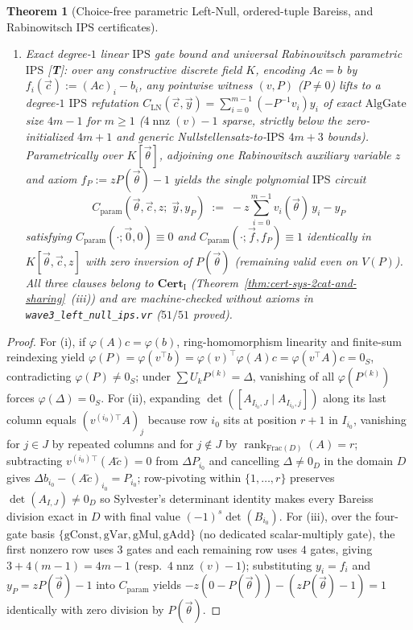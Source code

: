 \documentclass[11pt]{article}
\theoremstyle{plain}
\newtheorem{theorem}{Theorem}[section]
\theoremstyle{definition}
\begin{document}
\begin{theorem}[Choice-free parametric Left-Null, ordered-tuple Bareiss, and Rabinowitsch $\mathrm{IPS}$ certificates]
\begin{enumerate}[nosep,label=(\roman*)]
\item \emph{Exact degree-$1$ linear $\mathrm{IPS}$ gate bound and universal Rabinowitsch parametric $\mathrm{IPS}$ \textup{[\textbf{T}]}}: over any constructive discrete field $K$, encoding $Ac = b$ by $f_i(\vec{c}) := (Ac)_i - b_i$, any pointwise witness $(v, P)$ ($P \neq 0$) lifts to a degree-$1$ $\mathrm{IPS}$ refutation $C_{\mathrm{LN}}(\vec{c}, \vec{y}) = \sum_{i=0}^{m-1} (-P^{-1} v_i) y_i$ of exact $\mathrm{AlgGate}$ size $4m - 1$ for $m \ge 1$ ($4\operatorname{nnz}(v) - 1$ sparse, strictly below the zero-initialized $4m + 1$ and generic Nullstellensatz-to-$\mathrm{IPS}$ $4m + 3$ bounds). Parametrically over $K[\vec{\theta}]$, adjoining one Rabinowitsch auxiliary variable $z$ and axiom $f_P := z P(\vec{\theta}) - 1$ yields the single polynomial $\mathrm{IPS}$ circuit
\[
  C_{\mathrm{param}}(\vec{\theta}, \vec{c}, z;\; \vec{y}, y_P) \;:=\; -z \sum_{i=0}^{m-1} v_i(\vec{\theta})\, y_i - y_P
\]
satisfying $C_{\mathrm{param}}(\cdot; \vec{0}, 0) \equiv 0$ and $C_{\mathrm{param}}(\cdot; \vec{f}, f_P) \equiv 1$ identically in $K[\vec{\theta}, \vec{c}, z]$ with \emph{zero inversion of $P(\vec{\theta})$} (remaining valid even on $V(P)$). All three clauses belong to $\mathbf{Cert}_{\mathrm{I}}$ (Theorem~\ref{thm:cert-sys-2cat-and-sharing}~(iii)) and are machine-checked without axioms in \texttt{wave3\_left\_null\_ips.vr} ($51/51$ proved).
\end{enumerate}
\end{theorem}
\begin{proof}
For (i), if $\varphi(A)c = \varphi(b)$, ring-homomorphism linearity and finite-sum reindexing yield $\varphi(P) = \varphi(v^\top b) = \varphi(v)^\top \varphi(A) c = \varphi(v^\top A) c = 0_S$, contradicting $\varphi(P) \neq 0_S$; under $\sum U_k P^{(k)} = \Delta$, vanishing of all $\varphi(P^{(k)})$ forces $\varphi(\Delta) = 0_S$. For (ii), expanding $\det([A_{I_{i_0}, J} \mid A_{I_{i_0}, j}])$ along its last column equals $(v^{(i_0)\top} A)_j$ because row $i_0$ sits at position $r+1$ in $I_{i_0}$, vanishing for $j \in J$ by repeated columns and for $j \notin J$ by $\operatorname{rank}_{\mathrm{Frac}(D)}(A) = r$; subtracting $v^{(i_0)\top}(A\tilde{c}) = 0$ from $\Delta P_{i_0}$ and cancelling $\Delta \neq 0_D$ in the domain $D$ gives $\Delta b_{i_0} - (A\tilde{c})_{i_0} = P_{i_0}$; row-pivoting within $\{1,\dots,r\}$ preserves $\det(A_{I,J}) \neq 0_D$ so Sylvester's determinant identity makes every Bareiss division exact in $D$ with final value $(-1)^s \det(B_{i_0})$. For (iii), over the four-gate basis $\{\mathrm{gConst}, \mathrm{gVar}, \mathrm{gMul}, \mathrm{gAdd}\}$ (no dedicated scalar-multiply gate), the first nonzero row uses $3$ gates and each remaining row uses $4$ gates, giving $3 + 4(m-1) = 4m - 1$ (resp.\ $4\operatorname{nnz}(v) - 1$); substituting $y_i = f_i$ and $y_P = z P(\vec{\theta}) - 1$ into $C_{\mathrm{param}}$ yields $-z(0 - P(\vec{\theta})) - (z P(\vec{\theta}) - 1) = 1$ identically with zero division by $P(\vec{\theta})$.
\end{proof}
\end{document}

